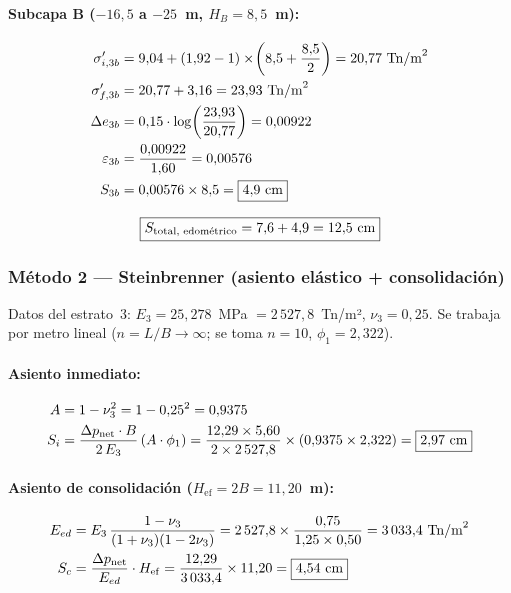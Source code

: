 \paragraph{Subcapa B ($-16{,}5$ a $-25$~m, $H_{B} = 8{,}5$~m):}
\begin{align*}
  \sigma'_{i,3b} &= 9{,}04 + (1{,}92-1)\times\!\left(8{,}5+\frac{8{,}5}{2}\right)
                  = 20{,}77~\text{Tn/m}^2 \\
  \sigma'_{f,3b} &= 20{,}77 + 3{,}16 = 23{,}93~\text{Tn/m}^2 \\
  \Delta e_{3b}  &= 0{,}15\cdot\log\!\left(\frac{23{,}93}{20{,}77}\right) = 0{,}00922 \\
  \varepsilon_{3b} &= \frac{0{,}00922}{1{,}60} = 0{,}00576 \\
  S_{3b} &= 0{,}00576\times 8{,}5 = \boxed{4{,}9~\text{cm}}
\end{align*}

\begin{equation}
  \boxed{S_{\text{total, edométrico}} = 7{,}6 + 4{,}9 = 12{,}5~\text{cm}}
  \label{eq:asiento_edom}
\end{equation}

\subsubsection{Método 2 — Steinbrenner (asiento elástico + consolidación)}

Datos del estrato~3: $E_3 = 25{,}278$~MPa $= 2\,527{,}8$~Tn/m²,
$\nu_3 = 0{,}25$. Se trabaja por metro lineal ($n = L/B \to \infty$;
se toma $n=10$, $\phi_1 = 2{,}322$).

\paragraph{Asiento inmediato:}
\begin{align*}
  A &= 1 - \nu_3^2 = 1 - 0{,}25^2 = 0{,}9375 \\
  S_i &= \frac{\Delta p_{\text{net}}\cdot B}{2\,E_3}\,(A\cdot\phi_1)
       = \frac{12{,}29\times 5{,}60}{2\times 2\,527{,}8}
         \times(0{,}9375\times 2{,}322)
       = \boxed{2{,}97~\text{cm}}
\end{align*}

\paragraph{Asiento de consolidación ($H_{\mathrm{ef}} = 2B = 11{,}20$~m):}
\begin{align*}
  E_{ed} &= E_3\,\frac{1-\nu_3}{(1+\nu_3)(1-2\nu_3)}
           = 2\,527{,}8\times\frac{0{,}75}{1{,}25\times 0{,}50}
           = 3\,033{,}4~\text{Tn/m}^2 \\
  S_c    &= \frac{\Delta p_{\text{net}}}{E_{ed}}\cdot H_{\mathrm{ef}}
           = \frac{12{,}29}{3\,033{,}4}\times 11{,}20
           = \boxed{4{,}54~\text{cm}}
\end{align*}

